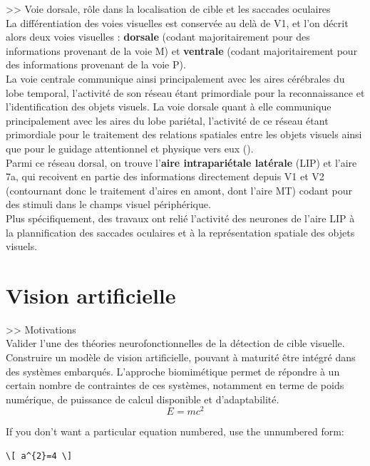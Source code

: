 >> Voie dorsale, rôle dans la localisation de cible et les saccades oculaires\\
La différentiation des voies visuelles est conservée au delà de V1, et l'on décrit alors deux voies visuelles :  \textbf{dorsale} (codant majoritairement pour des informations provenant de la voie M) et  \textbf{ventrale} (codant majoritairement pour des informations provenant de la voie P).\\
La voie centrale communique ainsi principalement avec les aires cérébrales du lobe temporal, l'activité de son réseau étant primordiale pour la reconnaissance et l'identification des objets visuels. La voie dorsale quant à elle communique principalement avec les aires du lobe pariétal, l'activité de ce réseau étant primordiale pour le traitement des relations spatiales entre les objets visuels ainsi que pour le guidage attentionnel et physique vers eux (\cite{Werner2014}).\\
Parmi ce réseau dorsal, on trouve l'\textbf{aire intrapariétale latérale} (LIP) et l'aire 7a, qui recoivent en partie des informations directement depuis V1 et V2 (contournant donc le traitement d'aires en amont, dont l'aire MT) codant pour des stimuli dans le champs visuel périphérique.\\
Plus spécifiquement, des travaux ont relié l'activité des neurones de l'aire LIP à la plannification des saccades oculaires et à la représentation spatiale des objets visuels.


\section{Vision artificielle}
>> Motivations\\
Valider l'une des théories neurofonctionnelles de la détection de cible visuelle.\\
Construire un modèle de vision artificielle, pouvant à maturité être intégré dans des systèmes embarqués. L'approche biomimétique permet de répondre à un certain nombre de contraintes de ces systèmes, notamment en terme de poids numérique, de puissance de calcul disponible et d'adaptabilité.\\

\begin{equation}
E = mc^{2}
\label{eqn:Einstein}
\end{equation}

If you don't want a particular equation numbered, use the unnumbered form:
\begin{verbatim}
\[ a^{2}=4 \]
\end{verbatim}
